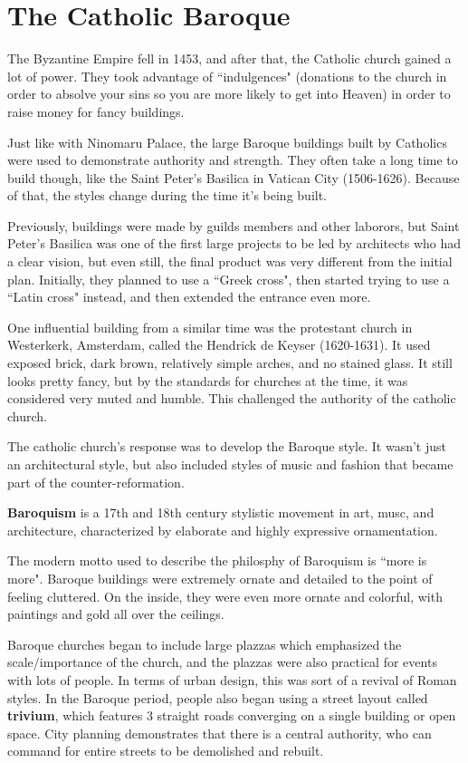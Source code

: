 \documentclass[class=article, crop=false]{standalone}
\begin{document}
\section{The Catholic Baroque}
The Byzantine Empire fell in 1453, and after that, the Catholic church gained a lot of power. They took advantage of ``indulgences" (donations to the church in order to absolve your sins so you are more likely to get into Heaven) in order to raise money for fancy buildings.
\par
Just like with Ninomaru Palace, the large Baroque buildings built by Catholics were used to demonstrate authority and strength. They often take a long time to build though, like the Saint Peter's Basilica in Vatican City (1506-1626). Because of that, the styles change during the time it's being built.
\par
Previously, buildings were made by guilds members and other laborors, but Saint Peter's Basilica was one of the first large projects to be led by architects who had a clear vision, but even still, the final product was very different from the initial plan. Initially, they planned to use a ``Greek cross", then started trying to use a ``Latin cross" instead, and then extended the entrance even more.
\par
One influential building from a similar time was the protestant church in Westerkerk, Amsterdam, called the Hendrick de Keyser (1620-1631). It used exposed brick, dark brown, relatively simple arches, and no stained glass. It still looks pretty fancy, but by the standards for churches at the time, it was considered very muted and humble. This challenged the authority of the catholic church.
\par
The catholic church's response was to develop the Baroque style. It wasn't just an architectural style, but also included styles of music and fashion that became part of the counter-reformation.
\par
\textbf{Baroquism} is a 17th and 18th century stylistic movement in art, musc, and architecture, characterized by elaborate and highly expressive ornamentation.
\par
The modern motto used to describe the philosphy of Baroquism is ``more is more". Baroque buildings were extremely ornate and detailed to the point of feeling cluttered. On the inside, they were even more ornate and colorful, with paintings and gold all over the ceilings.
\par
Baroque churches began to include large plazzas which emphasized the scale/importance of the church, and the plazzas were also practical for events with lots of people. In terms of urban design, this was sort of a revival of Roman styles. In the Baroque period, people also began using a street layout called \textbf{trivium}, which features 3 straight roads converging on a single building or open space. City planning demonstrates that there is a central authority, who can command for entire streets to be demolished and rebuilt.
\end{document}

